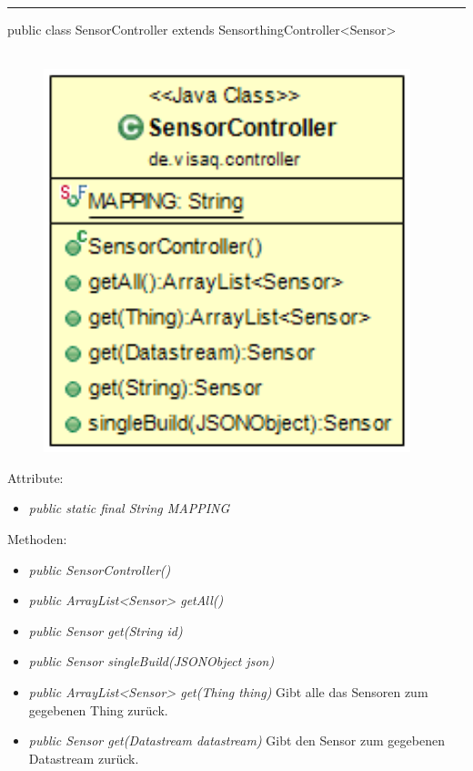 \rule{\textwidth}{0.4pt}
public class SensorController extends SensorthingController<Sensor>
\\\\
\begin{minipage}{0.4\textwidth}
    \begin{figure}[H]
        {\centering\includegraphics[width=0.95\textwidth]{media/backend/controller/classes/SensorController.png}}
    \end{figure}
    \end{minipage} \hfill
\begin{minipage}{0.6\textwidth}
\end{minipage}

Attribute:
\begin{itemize}
    \item \emph{public static final String MAPPING} \mappingDescription
\end{itemize}
Methoden:
\begin{itemize}
    \item \emph{public SensorController()}
    \item \emph{public ArrayList<Sensor> getAll()}
    \extendsSensorthingController
    \item \emph{public Sensor get(String id)}
    \extendsSensorthingController
    \item \emph{public Sensor singleBuild(JSONObject json)}
    \extendsSensorthingController
    \item \emph{public ArrayList<Sensor> get(Thing thing)}
    Gibt alle das Sensoren zum gegebenen Thing zurück.
    \item \emph{public Sensor get(Datastream datastream)}
    Gibt den Sensor zum gegebenen Datastream zurück.
\end{itemize}

